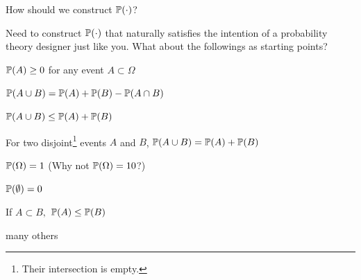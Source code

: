 \documentclass[fleqn,aspectratio=169]{beamer}
\begin{document}
\begin{frame}{How should we construct $\mathbb{P}( \cdot )$?}

\plitemsep 0.1in

\bci [$\bullet$]

\item Need to construct $\mathbb{P}( \cdot )$ that naturally satisfies the intention of a probability theory designer just like you. What about the followings as starting points? 

\medskip

\bci
\item<2-> $\mathbb{P}( A ) \geq 0$ for any event $A \subset \Omega$

\item<3-> $\mathbb{P}( A \cup B ) = \mathbb{P}( A ) + \mathbb{P}( B ) - \mathbb{P}( A \cap B )$

\item<3-> $\mathbb{P}( A \cup B ) \leq  \mathbb{P}( A ) + \mathbb{P}( B )$ 

\item<3-> For two disjoint\footnote{Their intersection is empty.} events $A$ and $B$, $\mathbb{P}( A \cup B ) = \mathbb{P}( A ) + \mathbb{P}( B )$

\item<4-> $\mathbb{P}( \Omega ) = 1$ (Why not $\mathbb{P}( \Omega ) = 10$?)

\item<4-> $\mathbb{P}( \emptyset ) = 0$

\item<5-> If $A \subset B,$ $\mathbb{P}( A ) \leq \mathbb{P}( B )$

\item<5-> many others
\eci
\eci

\end{frame}
\end{document}
